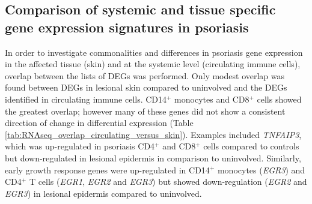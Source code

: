 



\subsection{Comparison of systemic and tissue specific gene expression signatures in psoriasis}

In order to investigate commonalities and differences in psoriasis gene expression in the affected tissue (skin) and at the systemic level (circulating immune cells), overlap between the lists of DEGs was performed. Only modest overlap was found between DEGs in lesional skin compared to uninvolved and the DEGs identified in circulating immune cells. CD14$^+$ monocytes and CD8$^+$ cells showed the greatest overlap; however many of these genes did not show a consistent direction of change in differential expression (Table \ref{tab:RNAseq_overlap_circulating_versus_skin}). Examples included \textit{TNFAIP3}, which was up-regulated in psoriasis CD4$^+$ and CD8$^+$ cells compared to controls but down-regulated in lesional epidermis in comparison to uninvolved. Similarly, early growth response genes were up-regulated in CD14$^+$ monocytes (\textit{EGR3}) and CD4$^+$ T cells (\textit{EGR1}, \textit{EGR2} and \textit{EGR3}) but showed down-regulation (\textit{EGR2} and \textit{EGR3}) in lesional epidermis compared to uninvolved.  

